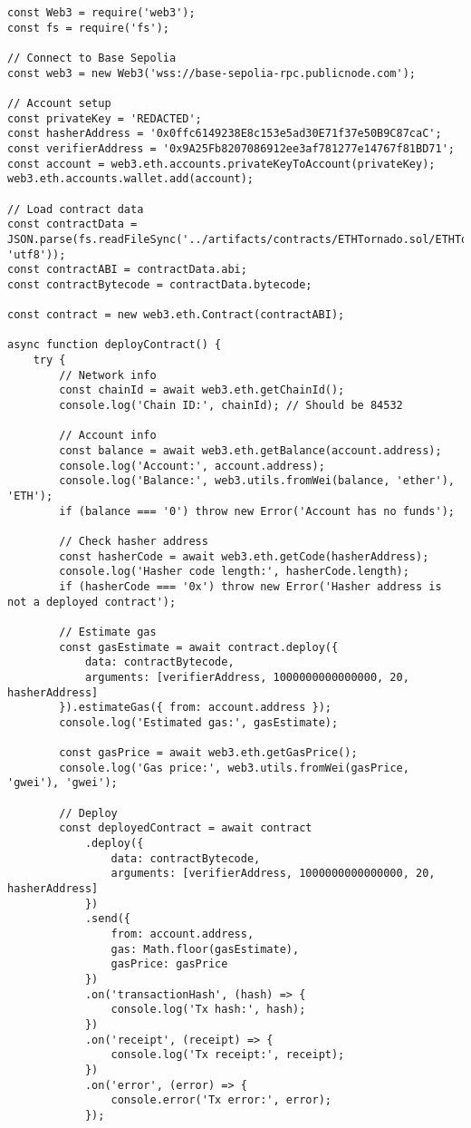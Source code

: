 \begin{lstlisting}
const Web3 = require('web3');
const fs = require('fs');

// Connect to Base Sepolia
const web3 = new Web3('wss://base-sepolia-rpc.publicnode.com');

// Account setup
const privateKey = 'REDACTED';
const hasherAddress = '0x0ffc6149238E8c153e5ad30E71f37e50B9C87caC';
const verifierAddress = '0x9A25Fb8207086912ee3af781277e14767f81BD71';
const account = web3.eth.accounts.privateKeyToAccount(privateKey);
web3.eth.accounts.wallet.add(account);

// Load contract data
const contractData = JSON.parse(fs.readFileSync('../artifacts/contracts/ETHTornado.sol/ETHTornado.json', 'utf8'));
const contractABI = contractData.abi;
const contractBytecode = contractData.bytecode;

const contract = new web3.eth.Contract(contractABI);

async function deployContract() {
    try {
        // Network info
        const chainId = await web3.eth.getChainId();
        console.log('Chain ID:', chainId); // Should be 84532

        // Account info
        const balance = await web3.eth.getBalance(account.address);
        console.log('Account:', account.address);
        console.log('Balance:', web3.utils.fromWei(balance, 'ether'), 'ETH');
        if (balance === '0') throw new Error('Account has no funds');

        // Check hasher address
        const hasherCode = await web3.eth.getCode(hasherAddress);
        console.log('Hasher code length:', hasherCode.length);
        if (hasherCode === '0x') throw new Error('Hasher address is not a deployed contract');

        // Estimate gas
        const gasEstimate = await contract.deploy({
            data: contractBytecode,
            arguments: [verifierAddress, 1000000000000000, 20, hasherAddress]
        }).estimateGas({ from: account.address });
        console.log('Estimated gas:', gasEstimate);

        const gasPrice = await web3.eth.getGasPrice();
        console.log('Gas price:', web3.utils.fromWei(gasPrice, 'gwei'), 'gwei');

        // Deploy
        const deployedContract = await contract
            .deploy({
                data: contractBytecode,
                arguments: [verifierAddress, 1000000000000000, 20, hasherAddress]
            })
            .send({
                from: account.address,
                gas: Math.floor(gasEstimate),
                gasPrice: gasPrice
            })
            .on('transactionHash', (hash) => {
                console.log('Tx hash:', hash);
            })
            .on('receipt', (receipt) => {
                console.log('Tx receipt:', receipt);
            })
            .on('error', (error) => {
                console.error('Tx error:', error);
            });


\end{lstlisting}
